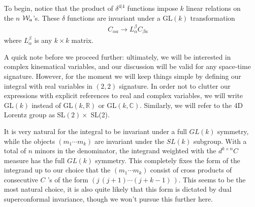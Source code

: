 \documentclass[12pt]{article}
\newcommand{\be}{\begin{eqnarray}}
\newcommand{\ee}{\end{eqnarray}}
\begin{document}
To begin, notice that the product of $\delta^{4|4}$ functions impose $k$ linear relations on the $n$ ${\cal W}_a$'s. These $\delta$ functions are invariant under a GL$(k)$
transformation
\be
C_{\alpha a} \to L^{\beta}_{\alpha} C_{\beta a}
\ee
where $L^\beta_\alpha$ is any $k \times k$ matrix.

A quick note before we proceed further: ultimately, we will be interested in complex kinematical variables, and our discussion will be valid for any space-time signature.  However, for the moment we will keep things simple by defining our integral with real variables in $(2,2)$ signature. In order not to clutter our expressions with explicit references to real and complex variables, we will write GL$(k)$ instead of GL$(k,\mathbb{R})$ or GL$(k,\mathbb{C})$. Similarly, we will refer to the 4D Lorentz group as SL$(2) \times$ SL(2).

It is very natural for the integral to be invariant under a full $GL(k)$ symmetry, while the objects $(m_1 \cdots m_k)$ are invariant under the $SL(k)$ subgroup. With a total of $n$ minors in the denominator, the integrand weighted with the $d^{k \times n} C$ measure has the full $GL(k)$ symmetry. This completely fixes the form of the
integrand up to our choice that the $(m_1 \cdots m_k)$ consist of cross products of consecutive $C$ 's of the form $(j \, (j+1) \cdots (j+k -1) \,)$. This seems to be the most natural choice, it is also quite likely that this form is dictated by dual superconformal invariance, though we won't pursue this further here.
\end{document}
